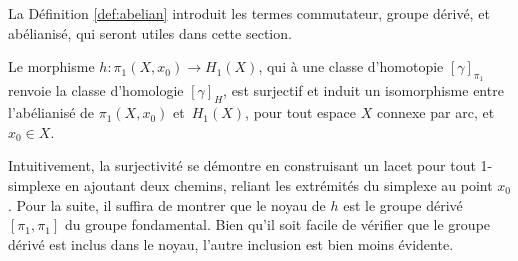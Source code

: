 La Définition \ref{def:abelian} introduit les termes commutateur, groupe dérivé, et abélianisé, qui seront utiles dans cette section.

\begin{theorem}
Le morphisme $h:\pi_1(X,x_0)\to H_1(X)$, qui à une classe d'homotopie $[\gamma]_{\pi_1}$ renvoie la classe d'homologie $[\gamma]_H$, est surjectif et induit un isomorphisme entre l'abélianisé de $\pi_1(X,x_0)$ et~$H_1(X)$, pour tout espace $X$ connexe par arc, et $x_0\in X$.
\end{theorem}

Intuitivement, la surjectivité se démontre en construisant un lacet pour tout 1-simplexe en ajoutant deux chemins, reliant les extrémités du simplexe au point $x_0$. Pour la suite, il suffira de montrer que le noyau de $h$ est le groupe dérivé $[\pi_1,\pi_1]$ du groupe fondamental. Bien qu'il soit facile de vérifier que le groupe dérivé est inclus dans le noyau, l'autre inclusion est bien moins évidente.


